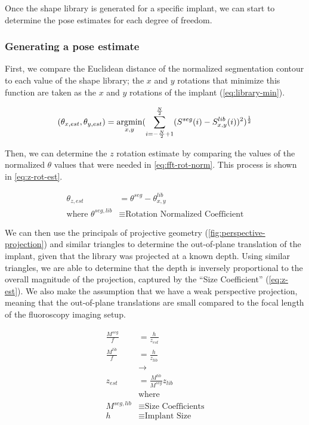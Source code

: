 Once the shape library is generated for a specific implant, we can start to determine the pose estimates for each degree of freedom.

\subsubsection{Generating a pose estimate}
First, we compare the Euclidean distance of the normalized segmentation contour to each value of the shape library; the $x$ and $y$ rotations that minimize this function are taken as the $x$ and $y$ rotations of the implant (\cref{eq:library-min}).

\begin{equation}
    (\theta_{x,est},\theta_{y,est}) = \operatorname*{\arg\!min}_{x,y}(\sum_{i = -\frac{N}{2} + 1}^{\frac{N}{2}}(S^{seg}(i) - S^{lib}_{x,y}(i))^2)^{\frac{1}{2}}
    \label{eq:library-min}
\end{equation}

Then, we can determine the $z$ rotation estimate by comparing the values of the normalized $\theta$ values that were needed in \cref{eq:fft-rot-norm}. This process is shown in \cref{eq:z-rot-est}.

\begin{equation}
    \begin{aligned}
        \theta_{z,est} &= \theta^{seg} - \theta^{lib}_{x,y}\\
        \text{where } \theta^{seg,lib} &\equiv \text{Rotation Normalized Coefficient}
    \end{aligned}
\label{eq:z-rot-est}
\end{equation}

We can then use the principals of projective geometry (\cref{fig:perspective-projection}) and similar triangles to determine the out-of-plane translation of the implant, given that the library was projected at a known depth. Using similar triangles, we are able to determine that the depth is inversely proportional to the overall magnitude of the projection, captured by the ``Size Coefficient'' (\cref{eq:z-est}). We also make the assumption that we have a weak perspective projection, meaning that the out-of-plane translations are small compared to the focal length of the fluoroscopy imaging setup.

\begin{equation}
    \begin{aligned}
        \frac{M^{seg}}{f} &= \frac{h}{z_{est}}\\
        \frac{M^{lib}}{f} &= \frac{h}{z_{lib}}\\
        & \rightarrow \\
        z_{est}& = \frac{M^{lib}}{M^{seg}}z_{lib} \\
        &\text{where }\\
        M^{seg,lib} &\equiv \text{Size Coefficients} \\
        h &\equiv \text{Implant Size}
    \end{aligned}
    \label{eq:z-est}
\end{equation}

